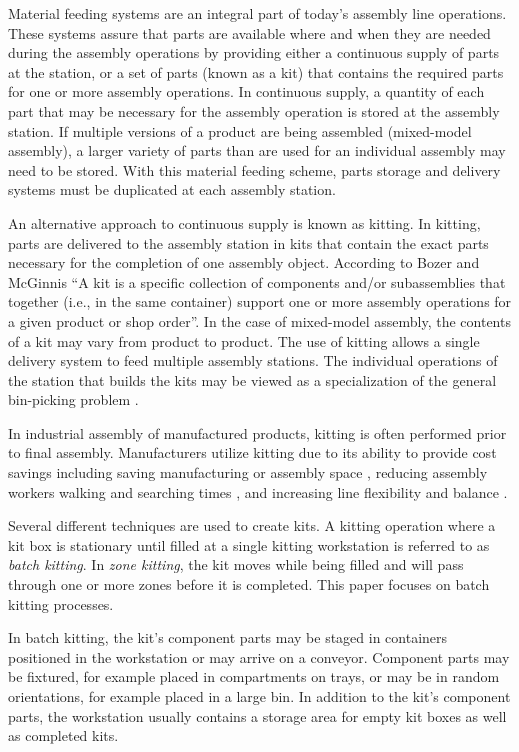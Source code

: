 
Material feeding systems are an integral part of today's assembly line operations.
These systems assure that parts are available where and when
they are needed during the assembly operations by providing either a continuous
supply of parts at the station, or a set of parts (known
as a kit) that contains the required parts for one or more assembly operations.
In continuous supply, a quantity of each part that
may be necessary for the assembly operation is stored at the assembly station.
If multiple versions of a product are being assembled (mixed-model assembly),
a larger variety of parts than are used for an individual assembly may need
to be stored. With this material feeding scheme, parts
storage and delivery systems must be duplicated at each assembly station.

An alternative approach to continuous supply is known as kitting. In kitting,
parts are delivered to the assembly station in kits that contain
the exact parts necessary for the completion of one assembly object.
According to Bozer and McGinnis \cite{Bozer1992} ``A kit is a specific
collection of components and/or subassemblies that together
(i.e., in the same container) support one or more assembly
operations for a given product or shop order''. In the case of mixed-model
assembly, the contents of a kit may vary from product to product.
The use of kitting allows a single delivery system to feed
multiple assembly stations. The individual operations of the station that
builds the kits may be viewed as a specialization of the general
bin-picking problem \cite{Schyja2012}.

In industrial assembly of manufactured products, kitting is
often performed prior to final assembly. Manufacturers utilize kitting
due to its ability to provide cost savings \cite{Carlsson_2008}
including saving manufacturing or assembly space \cite{Medbo2003},
reducing assembly workers walking and searching times \cite{Schwind1992},
and increasing line flexibility \cite{Bozer1992} and balance \cite{Jiao2000}.

Several different techniques are used to create kits. A kitting
operation where a kit box is stationary until filled at a single
kitting workstation is referred to as {\it batch kitting}.
In {\it zone kitting}, the kit moves while being filled and will pass through one or
more zones before it is completed. This paper focuses on batch kitting processes.

In batch kitting, the kit's component parts may be staged in
containers positioned in the workstation or may arrive on a conveyor.
Component parts may be fixtured, for example placed in compartments
on trays, or may be in random orientations, for example
placed in a large bin. In addition to the kit's component parts,
the workstation usually contains a storage area for empty kit boxes as
well as completed kits.

